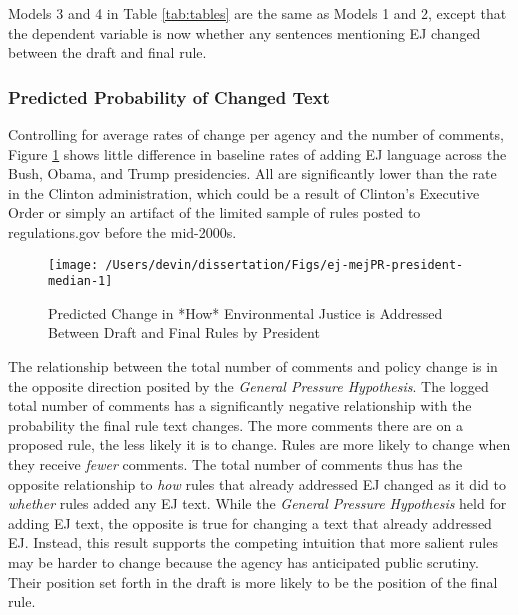 \documentclass[
      12pt,
        ]{article}
\begin{document}
Models 3 and 4 in Table \ref{tab:tables} are the same as Models 1 and 2, except that the dependent variable is now whether any sentences mentioning EJ changed between the draft and final rule.

\hypertarget{predicted-probability-of-changed-text}{%
\subsubsection{Predicted Probability of Changed Text}\label{predicted-probability-of-changed-text}}

Controlling for average rates of change per agency and the number of comments, Figure \ref{fig:ej-mejPR-president-median-1} shows little difference in baseline rates of adding EJ language across the Bush, Obama, and Trump presidencies. All are significantly lower than the rate in the Clinton administration, which could be a result of Clinton's Executive Order or simply an artifact of the limited sample of rules posted to regulations.gov before the mid-2000s.

\begin{figure}

{\centering \texttt{[image: /Users/devin/dissertation/Figs/ej-mejPR-president-median-1]} 

}

\caption{Predicted Change in *How* Environmental Justice is Addressed Between Draft and Final Rules by President}\label{fig:ej-mejPR-president-median-1}
\end{figure}

The relationship between the total number of comments and policy change is in the opposite direction posited by the \emph{General Pressure Hypothesis}. The logged total number of comments has a significantly negative relationship with the probability the final rule text changes. The more comments there are on a proposed rule, the less likely it is to change. Rules are more likely to change when they receive \emph{fewer} comments. The total number of comments thus has the opposite relationship to \emph{how} rules that already addressed EJ changed as it did to \emph{whether} rules added any EJ text. While the \emph{General Pressure Hypothesis} held for adding EJ text, the opposite is true for changing a text that already addressed EJ. Instead, this result supports the competing intuition that more salient rules may be harder to change because the agency has anticipated public scrutiny. Their position set forth in the draft is more likely to be the position of the final rule.
\end{document}

